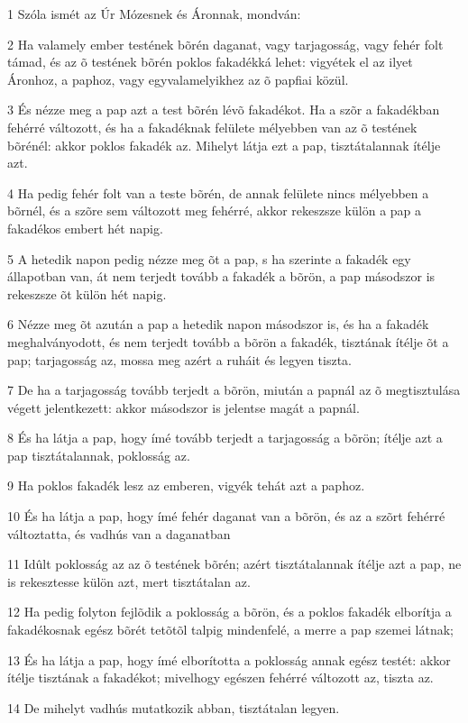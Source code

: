 \par 1 Szóla ismét az Úr Mózesnek és Áronnak, mondván:
\par 2 Ha valamely ember testének bõrén daganat, vagy tarjagosság, vagy fehér folt támad, és az õ testének bõrén poklos fakadékká lehet: vigyétek el az ilyet Áronhoz, a paphoz, vagy egyvalamelyikhez az õ papfiai közül.
\par 3 És nézze meg a pap azt a test bõrén lévõ fakadékot. Ha a szõr a fakadékban fehérré változott, és ha a fakadéknak felülete mélyebben van az õ testének bõrénél: akkor poklos fakadék az. Mihelyt látja ezt a pap, tisztátalannak ítélje azt.
\par 4 Ha pedig fehér folt van a teste bõrén, de annak felülete nincs mélyebben a bõrnél, és a szõre sem változott meg fehérré, akkor rekeszsze külön a pap a fakadékos embert hét napig.
\par 5 A hetedik napon pedig nézze meg õt a pap, s ha szerinte a fakadék egy állapotban van, át nem terjedt tovább a fakadék a bõrön, a pap másodszor is rekeszsze õt külön hét napig.
\par 6 Nézze meg õt azután a pap a hetedik napon másodszor is, és ha a fakadék meghalványodott, és nem terjedt tovább a bõrön a fakadék, tisztának ítélje õt a pap; tarjagosság az, mossa meg azért a ruháit és legyen tiszta.
\par 7 De ha a tarjagosság tovább terjedt a bõrön, miután a papnál az õ megtisztulása végett jelentkezett: akkor másodszor is jelentse magát a papnál.
\par 8 És ha látja a pap, hogy ímé tovább terjedt a tarjagosság a bõrön; ítélje azt a pap tisztátalannak, poklosság az.
\par 9 Ha poklos fakadék lesz az emberen, vigyék tehát azt a paphoz.
\par 10 És ha látja a pap, hogy ímé fehér daganat van a bõrön, és az a szõrt fehérré változtatta, és vadhús van a daganatban
\par 11 Idûlt poklosság az az õ testének bõrén; azért tisztátalannak ítélje azt a pap, ne is rekesztesse külön azt, mert tisztátalan az.
\par 12 Ha pedig folyton fejlõdik a poklosság a bõrön, és a poklos fakadék elborítja a fakadékosnak egész bõrét tetõtõl talpig mindenfelé, a merre a pap szemei látnak;
\par 13 És ha látja a pap, hogy ímé elborította a poklosság annak egész testét: akkor ítélje tisztának a fakadékot; mivelhogy egészen fehérré változott az, tiszta az.
\par 14 De mihelyt vadhús mutatkozik abban, tisztátalan legyen.
